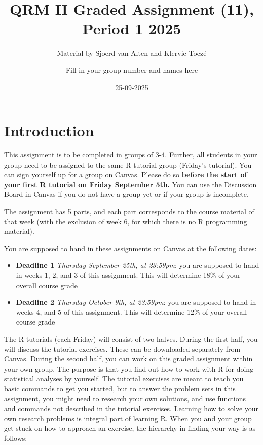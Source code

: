 \documentclass[
]{article}
\title{QRM II Graded Assignment (11), Period 1 2025}
\subtitle{Material by Sjoerd van Alten and Klervie Toczé}
\author{Fill in your group number and names here}
\date{25-09-2025}
\providecommand{\tightlist}{%
  \setlength{\itemsep}{0pt}\setlength{\parskip}{0pt}}
\begin{document}
\maketitle

\section{Introduction}\label{introduction}

This assignment is to be completed in groups of 3-4. Further, all
students in your group need to be assigned to the same R tutorial group
(Friday's tutorial). You can sign yourself up for a group on Canvas.
Please do so
\textbf{before the start of your first R tutorial on Friday September 5th.}
You can use the Discussion Board in Canvas if you do not have a group
yet or if your group is incomplete.

The assignment has 5 parts, and each part corresponds to the course
material of that week (with the exclusion of week 6, for which there is
no R programming material).

You are supposed to hand in these assignments on Canvas at the following
dates:

\begin{itemize}
\tightlist
\item
  \textbf{Deadline 1} \emph{Thursday September 25th, at 23:59pm}: you
  are supposed to hand in weeks 1, 2, and 3 of this assignment. This
  will determine 18\% of your overall course grade
\item
  \textbf{Deadline 2} \emph{Thursday October 9th, at 23:59pm}: you are
  supposed to hand in weeks 4, and 5 of this assignment. This will
  determine 12\% of your overall course grade
\end{itemize}

The R tutorials (each Friday) will consist of two halves. During the
first half, you will discuss the tutorial exercises. These can be
downloaded separately from Canvas. During the second half, you can work
on this graded assignment within your own group. The purpose is that you
find out how to work with R for doing statistical analyses by yourself.
The tutorial exercises are meant to teach you basic commands to get you
started, but to answer the problem sets in this assignment, you might
need to research your own solutions, and use functions and commands not
described in the tutorial exercises. Learning how to solve your own
research problems is integral part of learning R. When you and your
group get stuck on how to approach an exercise, the hierarchy in finding
your way is as follows:
\end{document}
